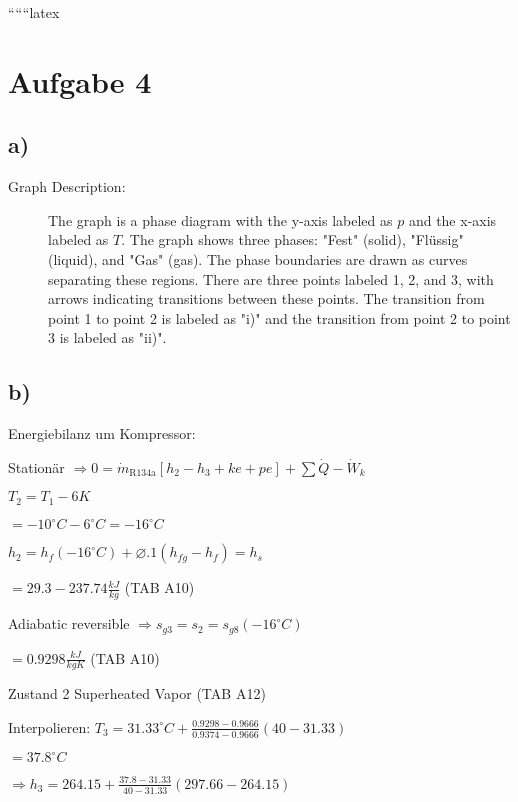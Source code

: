 
``````latex


\section*{Aufgabe 4}

\subsection*{a)}

\begin{description}
    \item[Graph Description:] The graph is a phase diagram with the y-axis labeled as $p$ and the x-axis labeled as $T$. The graph shows three phases: "Fest" (solid), "Flüssig" (liquid), and "Gas" (gas). The phase boundaries are drawn as curves separating these regions. There are three points labeled 1, 2, and 3, with arrows indicating transitions between these points. The transition from point 1 to point 2 is labeled as "i)" and the transition from point 2 to point 3 is labeled as "ii)".
\end{description}

\subsection*{b)}

Energiebilanz um Kompressor:

Stationär $\Rightarrow 0 = \dot{m}_{\text{R134a}} \left[ h_2 - h_3 + ke + pe \right] + \sum \dot{Q} - \dot{W}_k$

$T_2 = T_1 - 6K$

$= -10^\circ C - 6^\circ C = -16^\circ C$

$h_2 = h_f (-16^\circ C) + \varnothing .1 (h_{fg} - h_f) = h_s$

$= 29.3 - 237.74 \frac{kJ}{kg}$ \hspace{1cm} (TAB A10)

Adiabatic reversible $\Rightarrow s_{g3} = s_2 = s_{g8} (-16^\circ C)$

$= 0.9298 \frac{kJ}{kg K}$ \hspace{1cm} (TAB A10)

Zustand 2 Superheated Vapor \hspace{1cm} (TAB A12)

Interpolieren: $T_3 = 31.33^\circ C + \frac{0.9298 - 0.9666}{0.9374 - 0.9666} (40 - 31.33)$

$= 37.8^\circ C$

$\Rightarrow h_3 = 264.15 + \frac{37.8 - 31.33}{40 - 31.33} (297.66 - 264.15)$

